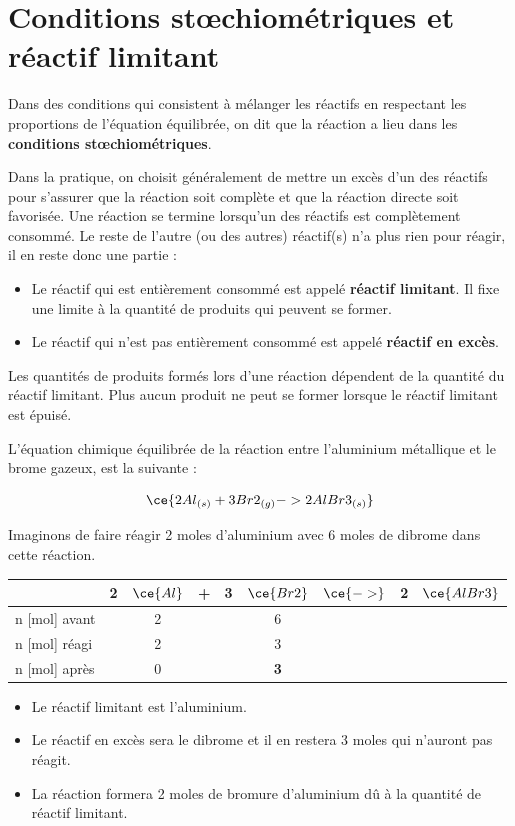 \documentclass[
  11pt,
  french,
  a4paper,
  openany]{book}
\providecommand{\tightlist}{%
  \setlength{\itemsep}{0pt}\setlength{\parskip}{0pt}}
\begin{document}
\hypertarget{conditions-stux153chiomuxe9triques-et-ruxe9actif-limitant}{%
\section{Conditions stœchiométriques et réactif limitant}\label{conditions-stux153chiomuxe9triques-et-ruxe9actif-limitant}}

Dans des conditions qui consistent à mélanger les réactifs en respectant les proportions de l'équation équilibrée, on dit que la réaction a lieu dans les \textbf{conditions stœchiométriques}.

Dans la pratique, on choisit généralement de mettre un excès d'un des réactifs pour s'assurer que la réaction soit complète et que la réaction directe soit favorisée. Une réaction se termine lorsqu'un des réactifs est complètement consommé. Le reste de l'autre (ou des autres) réactif(s) n'a plus rien pour réagir, il en reste donc une partie :

\begin{itemize}
\tightlist
\item
  Le réactif qui est entièrement consommé est appelé \textbf{réactif limitant}. Il fixe une limite à la quantité de produits qui peuvent se former.
\item
  Le réactif qui n'est pas entièrement consommé est appelé \textbf{réactif en excès}.
\end{itemize}

Les quantités de produits formés lors d'une réaction dépendent de la quantité du réactif limitant. Plus aucun produit ne peut se former lorsque le réactif limitant est épuisé.

L'équation chimique équilibrée de la réaction entre l'aluminium métallique et le brome gazeux, est la suivante :

\[ \ce{ 2 Al{}_{(s)} + 3 Br2{}_{(g)} -> 2 AlBr3{}_{(s)} } \]

Imaginons de faire réagir 2 moles d'aluminium avec 6 moles de dibrome dans cette réaction.

\begin{longtable}[]{@{}lcccccccc@{}}
\toprule
& 2 & \(\ce{Al}\) & + & 3 & \(\ce{Br2}\) & \(\ce{->}\) & 2 & \(\ce{AlBr3}\)\tabularnewline
\midrule
\endhead
n {[}mol{]} avant & & 2 & & & 6 & & &\tabularnewline
n {[}mol{]} réagi & & 2 & & & 3 & & &\tabularnewline
n {[}mol{]} après & & 0 & & & \textbf{3} & & &\tabularnewline
\bottomrule
\end{longtable}

\begin{itemize}
\tightlist
\item
  Le réactif limitant est l'aluminium.
\item
  Le réactif en excès sera le dibrome et il en restera 3 moles qui n'auront pas réagit.
\item
  La réaction formera 2 moles de bromure d'aluminium dû à la quantité de réactif limitant.
\end{itemize}
\end{document}
